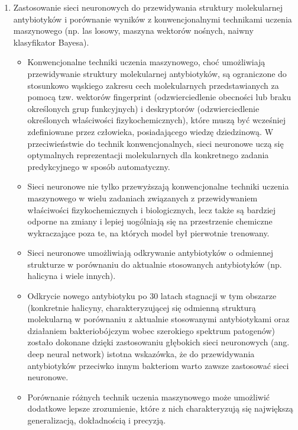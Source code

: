 \begin{enumerate}
    \item Zastosowanie sieci neuronowych do przewidywania struktury molekularnej antybiotyków i porównanie wyników z konwencjonalnymi technikami uczenia maszynowego (np. las losowy, maszyna wektorów nośnych, naiwny klasyfikator Bayesa).

    \begin{itemize}
    \item Konwencjonalne techniki uczenia maszynowego, choć umożliwiają przewidywanie struktury molekularnej antybiotyków, są ograniczone do stosunkowo wąskiego zakresu cech molekularnych przedstawianych za pomocą tzw. wektorów fingerprint (odzwierciedlenie obecności lub braku określonych grup funkcyjnych) i deskryptorów (odzwierciedlenie określonych właściwości fizykochemicznych), które muszą być wcześniej zdefiniowane przez człowieka, posiadającego wiedzę dziedzinową. W przeciwieństwie do technik konwencjonalnych, sieci neuronowe uczą się optymalnych reprezentacji molekularnych dla konkretnego zadania predykcyjnego w sposób automatyczny.
    \item Sieci neuronowe nie tylko przewyższają konwencjonalne techniki uczenia maszynowego w wielu zadaniach związanych z przewidywaniem właściwości fizykochemicznych i biologicznych, lecz także są bardziej odporne na zmiany i lepiej uogólniają się na przestrzenie chemiczne wykraczające poza te, na których model był pierwotnie trenowany.
    \item Sieci neuronowe umożliwiają odkrywanie antybiotyków o odmiennej strukturze w porównaniu do aktualnie stosowanych antybiotyków (np. halicyna i wiele innych).
    \item Odkrycie nowego antybiotyku po 30 latach stagnacji w tym obszarze  (konkretnie halicyny, charakteryzującej się odmienną strukturą molekularną w porównaniu z aktualnie stosowanymi antybiotykami oraz działaniem bakteriobójczym wobec szerokiego spektrum patogenów) zostało dokonane dzięki zastosowaniu głębokich sieci neuronowych (ang. deep neural network) \- istotna wskazówka, że do przewidywania antybiotyków przeciwko innym bakteriom warto zawsze zastosować sieci neuronowe.
    \item Porównanie różnych technik uczenia maszynowego może umożliwić dodatkowe lepsze zrozumienie, które z nich charakteryzują się największą generalizacją, dokładnością i precyzją.
    \end{itemize}

\end{enumerate}